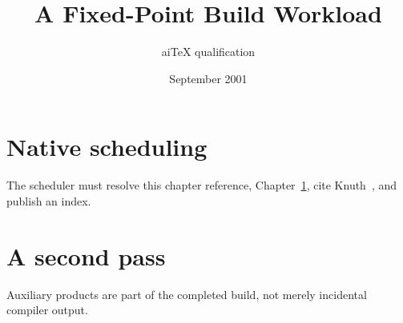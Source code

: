 \documentclass[11pt]{report}
\title{A Fixed-Point Build Workload}
\author{aiTeX qualification}
\date{September 2001}
\begin{document}
\maketitle
\tableofcontents
\chapter{Native scheduling}\label{ch:scheduling}
The scheduler must resolve this chapter reference,
Chapter~\ref{ch:scheduling}, cite Knuth~\cite{knuth1984}, and publish an index.
\chapter{A second pass}
Auxiliary products are part of the completed build,
not merely incidental compiler output.



\printindex
\end{document}
